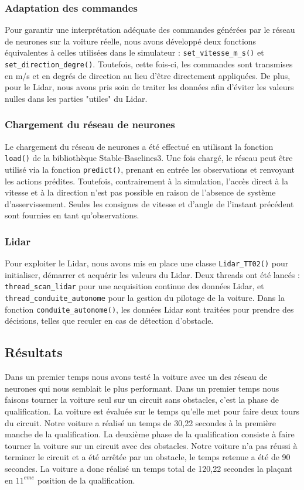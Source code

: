 \documentclass[french]{article}
\begin{document}
\subsubsection*{Adaptation des commandes}
Pour garantir une interprétation adéquate des commandes générées par le réseau de neurones sur la voiture réelle,
nous avons développé deux fonctions équivalentes à celles utilisées dans le simulateur : \texttt{set\_vitesse\_m\_s()} 
et \texttt{set\_direction\_degre()}. Toutefois, cette fois-ci, les commandes sont transmises en m/s et en degrés de 
direction au lieu d'être directement appliquées. De plus, pour le Lidar, nous avons pris soin de traiter les données 
afin d'éviter les valeurs nulles dans les parties "utiles" du Lidar.


\subsubsection*{Chargement du réseau de neurones}
Le chargement du réseau de neurones a été effectué en utilisant la fonction \texttt{load()} de la bibliothèque 
Stable-Baselines3. Une fois chargé, le réseau peut être utilisé via la fonction \texttt{predict()}, prenant en 
entrée les observations et renvoyant les actions prédites. Toutefois, contrairement à la simulation, l'accès direct 
à la vitesse et à la direction n'est pas possible en raison de l'absence de système d'asservissement. Seules les 
consignes de vitesse et d'angle de l'instant précédent sont fournies en tant qu'observations.

\subsubsection*{Lidar}
Pour exploiter le Lidar, nous avons mis en place une classe \texttt{Lidar\_TT02()} pour initialiser, démarrer 
et acquérir les valeurs du Lidar. Deux threads ont été lancés : \texttt{thread\_scan\_lidar} pour une acquisition 
continue des données Lidar, et \texttt{thread\_conduite\_autonome} pour la gestion du pilotage de la voiture. 
Dans la fonction \texttt{conduite\_autonome()}, les données Lidar sont traitées pour prendre des décisions, 
telles que reculer en cas de détection d'obstacle.

\subsection{Résultats}

Dans un premier temps nous avons testé la voiture avec un des réseau de neurones qui nous semblait le plus performant.
Dans un premier temps nous faisons tourner la voiture seul sur un circuit sans obstacles, c'est la phase de 
qualification. La voiture est évaluée sur le temps qu'elle met pour faire deux tours du circuit. Notre voiture a
réalisé un temps de 30,22 secondes à la première manche de la qualification. La deuxième phase de la qualification
consiste à faire tourner la voiture sur un circuit avec des obstacles. Notre voiture n'a pas réussi à terminer le
circuit et a été arrêtée par un obstacle, le temps retenue a été de 90 secondes. La voiture a donc réalisé un temps
total de 120,22 secondes la plaçant en $11^{eme}$ position de la qualification.
\end{document}
